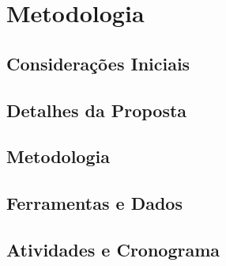 \chapter{Metodologia}
\label{cap-metodologia}


\section{Considerações Iniciais}

\section{Detalhes da Proposta}

\section{Metodologia}

\section{Ferramentas e Dados}

\section{Atividades e Cronograma}
%
